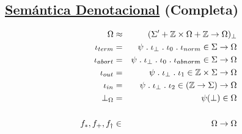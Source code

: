   \subsection*{\underline{Semántica Denotacional} (Completa)}
    \begin{eqnarray*}
      \Omega &\approx& (\Sigma' + \mathbb{Z} \times \Omega + \mathbb{Z} \to \Omega)_{\bot} \\
      \iota_{term} &=& \psi \; . \; \iota_{\bot} \; . \; \iota_0 \; . \; \iota_{norm} \in \Sigma \rightarrow \Omega \\
      \iota_{abort} &=& \psi \; . \; \iota_{\bot} \; . \; \iota_0 \; . \; \iota_{abnorm} \in \Sigma \rightarrow \Omega \\
      \iota_{out} &=& \psi \; . \; \iota_{\bot} \; . \; \iota_1 \in \mathbb{Z} \times \Sigma \rightarrow \Omega \\
      \iota_{in} &=& \psi \; . \; \iota_{\bot} \; . \; \iota_2 \in (\mathbb{Z} \rightarrow \Sigma) \rightarrow \Omega \\
      \bot_{\Omega} &=& \psi(\bot) \in \Omega \\ \\
      f_{\ast}, f_{+}, f_{\dag} &\in& \Omega \rightarrow \Omega \\
    \end{eqnarray*}
